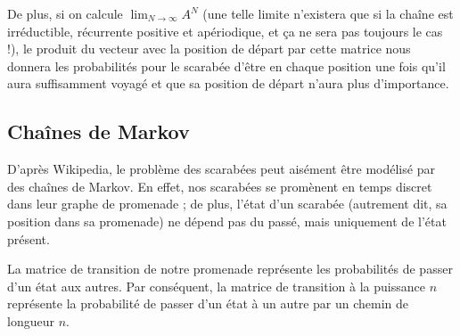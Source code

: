 \documentclass{scrartcl} \usepackage[utf8]{inputenc}
\begin{document}
  De plus, si on calcule $\lim_{N \to \infty} A^N$ (une telle limite
  n'existera que si la chaîne est irréductible, récurrente positive et
  apériodique, et ça ne sera pas toujours le cas !), le produit du
  vecteur avec la position de départ par cette matrice nous donnera
  les probabilités pour le scarabée d'être en chaque position une fois
  qu'il aura suffisamment voyagé et que sa position de départ n'aura
  plus d'importance.

  \subsection{Chaînes de Markov}

  D'après Wikipedia, le problème des scarabées peut aisément être
  modélisé par des chaînes de Markov. En effet, nos scarabées se
  promènent en temps discret dans leur graphe de promenade ; de plus,
  l'état d'un scarabée (autrement dit, sa position dans sa promenade)
  ne dépend pas du passé, mais uniquement de l'état présent.

  La matrice de transition de notre promenade représente les
  probabilités de passer d'un état aux autres. Par conséquent, la
  matrice de transition à la puissance $n$ représente la probabilité
  de passer d'un état à un autre par un chemin de longueur $n$.
\end{document}
